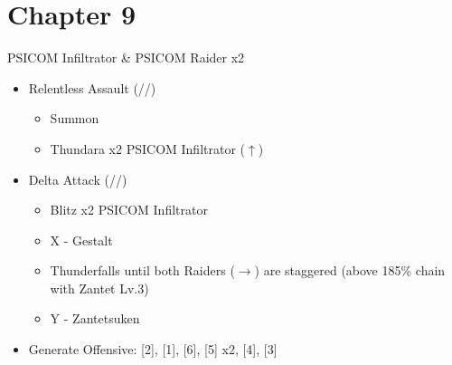 \chapter{Chapter 9}

\renewcommand{\first}{[1] Relentless Assault (\rav/\rav/\com)}
\renewcommand{\second}{[2] Delta Attack (\com/\rav/\sen)}
\begin{battle}[0:20]{PSICOM Infiltrator \& PSICOM Raider x2}
	\begin{itemize}
		\item \first
		      \begin{itemize}
			      \item Summon
			      \item Thundara x2 PSICOM Infiltrator ($\uparrow$)
		      \end{itemize}
		\item \second
		      \begin{itemize}
			      \item Blitz x2 PSICOM Infiltrator
			      \item X - Gestalt
			      \item Thunderfalls until both Raiders ($\rightarrow$) are staggered (above 185\% chain with Zantet Lv.3)
			      \item Y - Zantetsuken
		      \end{itemize}
	\end{itemize}
	  
\end{battle}

\begin{menu}
		\begin{itemize}
			\paradigm
			\begin{itemize}
				\item Generate Offensive: [2], [1], [6], [5] x2, [4], [3]
			\end{itemize}
		\end{itemize}
\end{menu}

\vfill
\renewcommand{\first}{[1] Smart Bomb (\rav/\rav/\sab)}
\renewcommand{\sixth}{[6] Relentless Assault (\rav/\rav/\com)}


